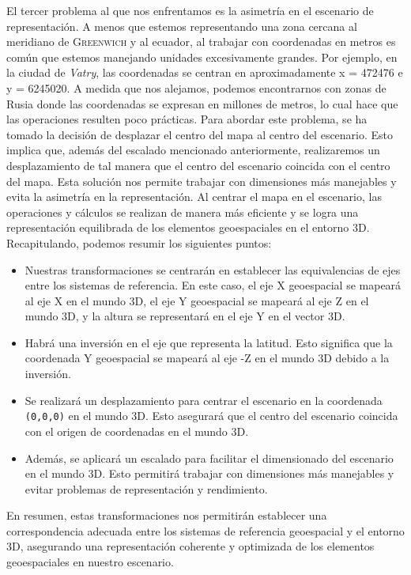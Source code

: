 \documentclass[a4paper, 11pt]{book}
\begin{document}
El tercer problema al que nos enfrentamos es la asimetría en el escenario de representación. A menos que estemos representando una zona cercana al meridiano de \textsc{Greenwich} y al ecuador, al trabajar con coordenadas en metros es común que estemos manejando unidades excesivamente grandes. Por ejemplo, en la ciudad de \emph{Vatry}, las coordenadas se centran en aproximadamente x = 472476 e y = 6245020. A medida que nos alejamos, podemos encontrarnos con zonas de Rusia donde las coordenadas se expresan en millones de metros, lo cual hace que las operaciones resulten poco prácticas.
Para abordar este problema, se ha tomado la decisión de desplazar el centro del mapa al centro del escenario. Esto implica que, además del escalado mencionado anteriormente, realizaremos un desplazamiento de tal manera que el centro del escenario coincida con el centro del mapa.
Esta solución nos permite trabajar con dimensiones más manejables y evita la asimetría en la representación. Al centrar el mapa en el escenario, las operaciones y cálculos se realizan de manera más eficiente y se logra una representación equilibrada de los elementos geoespaciales en el entorno 3D.
Recapitulando, podemos resumir los siguientes puntos:
\begin{itemize}
    \item Nuestras transformaciones se centrarán en establecer las equivalencias de ejes entre los sistemas de referencia. En este caso, el eje \textsc{X} \gls{geoespacial} se mapeará al eje X en el mundo \textsc{3D}, el eje Y geoespacial se mapeará al eje \textsc{Z} en el mundo \textsc{3D}, y la altura se representará en el eje Y en el vector 3D.
    \item Habrá una inversión en el eje que representa la latitud. Esto significa que la coordenada Y geoespacial se mapeará al eje \textsc{-Z} en el mundo \textsc{3D} debido a la inversión.
    \item Se realizará un desplazamiento para centrar el escenario en la coordenada \texttt{(0,0,0)} en el mundo \textsc{3D}. Esto asegurará que el centro del escenario coincida con el origen de coordenadas en el mundo \textsc{3D}.
    \item Además, se aplicará un escalado para facilitar el dimensionado del escenario en el mundo \textsc{3D}. Esto permitirá trabajar con dimensiones más manejables y evitar problemas de representación y rendimiento.
\end{itemize}
En resumen, estas transformaciones nos permitirán establecer una correspondencia adecuada entre los sistemas de referencia geoespacial y el entorno 3D, asegurando una representación coherente y optimizada de los elementos geoespaciales en nuestro escenario.
\end{document}
